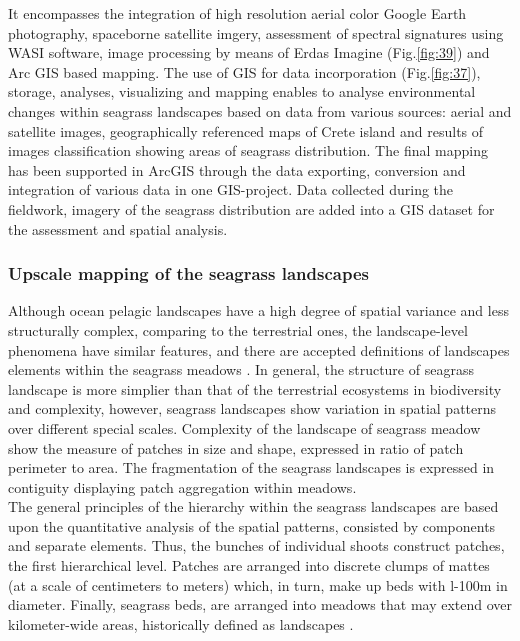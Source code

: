 \documentclass[10pt, a4paper]{article}
\begin{document}
It encompasses the integration of
high resolution aerial color Google Earth photography, spaceborne satellite imgery, assessment of
spectral signatures using WASI software, image processing by means of Erdas Imagine (Fig.\ref{fig:39}) and Arc GIS
based mapping. The use of GIS for data incorporation (Fig.\ref{fig:37}), storage, analyses, visualizing and mapping
enables to analyse environmental changes within seagrass landscapes based on data from various
sources: aerial and satellite images, geographically referenced maps of Crete island and results of
images classification showing areas of seagrass distribution.
The final mapping has been supported in ArcGIS through the data exporting, conversion and
integration of various data in one GIS-project. Data collected during the fieldwork, imagery
of the seagrass distribution are added into a GIS dataset for the assessment and spatial analysis.

\subsubsection{Upscale mapping of the seagrass landscapes}
Although ocean pelagic landscapes have a high degree of spatial variance and less structurally
complex, comparing to the terrestrial ones, the landscape-level phenomena have similar features, and
there are accepted definitions of landscapes elements within the seagrass meadows \cite{Robbins94}\label{Robbins94}. 
In general, the structure of seagrass landscape is more simplier than that of the terrestrial
ecosystems in biodiversity and complexity, however, seagrass landscapes show variation in spatial
patterns over different special scales. Complexity of the landscape of seagrass meadow show the
measure of patches in size and shape, expressed in ratio of patch perimeter to area. The fragmentation
of the seagrass landscapes is expressed in contiguity displaying patch aggregation within meadows.\\
The general principles of the hierarchy within the seagrass landscapes are based upon the quantitative
analysis of the spatial patterns, consisted by components and separate elements. Thus, the bunches of
individual shoots construct patches, the first hierarchical level. Patches are arranged into discrete
clumps of mattes (at a scale of centimeters to meters) which, in turn, make up beds with l-100m in
diameter. Finally, seagrass beds, are arranged into meadows that may extend over kilometer-wide
areas, historically defined as landscapes \cite{Robbins94}\label{Robbins94}.
\end{document}
